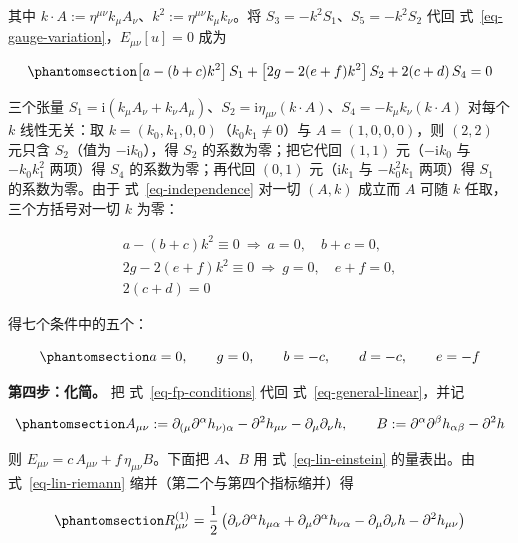 \documentclass[
  chinese,
  a4paper,
  UTF8,
  12pt,
  oneside,
  openany]{ctexbook}
\theoremstyle{plain}
\theoremstyle{plain}
\theoremstyle{plain}
\theoremstyle{definition}
\theoremstyle{plain}
\theoremstyle{plain}
\theoremstyle{remark}
\begin{document}
其中
\(k\cdot A:=\eta^{\mu\nu}k_{\mu}A_{\nu}\)、\(k^{2}:=\eta^{\mu\nu}k_{\mu}k_{\nu}\)。将
\(S_{3}=-k^{2}S_{1}\)、\(S_{5}=-k^{2}S_{2}\) 代回
式~\ref{eq-gauge-variation}，\(E_{\mu\nu}[u]=0\) 成为

\begin{equation}\protect\phantomsection\label{eq-independence}{
\left[a-(b+c)k^{2}\right]S_{1}
+\left[2g-2(e+f)k^{2}\right]S_{2}
+2(c+d)\,S_{4}=0
}\end{equation}

三个张量
\(S_{1}=\mathrm{i}(k_{\mu}A_{\nu}+k_{\nu}A_{\mu})\)、\(S_{2}=\mathrm{i}\eta_{\mu\nu}(k\cdot A)\)、\(S_{4}=-k_{\mu}k_{\nu}(k\cdot A)\)
对每个 \(k\) 线性无关：取
\(k=(k_{0},k_{1},0,0)\)（\(k_{0}k_{1}\neq0\)）与 \(A=(1,0,0,0)\)，则
\((2,2)\) 元只含 \(S_{2}\)（值为 \(-\mathrm{i}k_{0}\)），得 \(S_{2}\)
的系数为零；把它代回 \((1,1)\) 元（\(-\mathrm{i}k_{0}\) 与
\(-k_{0}k_{1}^{2}\) 两项）得 \(S_{4}\) 的系数为零；再代回 \((0,1)\)
元（\(\mathrm{i}k_{1}\) 与 \(-k_{0}^{2}k_{1}\) 两项）得 \(S_{1}\)
的系数为零。由于 式~\ref{eq-independence} 对一切 \((A,k)\) 成立而 \(A\)
可随 \(k\) 任取，三个方括号对一切 \(k\) 为零：

\[
\begin{gathered}
a-(b+c)k^{2}\equiv0\ \Longrightarrow\ a=0,\quad b+c=0,\\
2g-2(e+f)k^{2}\equiv0\ \Longrightarrow\ g=0,\quad e+f=0,\\
2(c+d)=0
\end{gathered}
\]

得七个条件中的五个：

\begin{equation}\protect\phantomsection\label{eq-fp-conditions}{
a = 0,
\qquad
g = 0,
\qquad
b = -c,
\qquad
d = -c,
\qquad
e = -f
}\end{equation}

\textbf{第四步：化简。} 把 式~\ref{eq-fp-conditions} 代回
式~\ref{eq-general-linear}，并记

\begin{equation}\protect\phantomsection\label{eq-AB-def}{
A_{\mu\nu}:=\partial_{(\mu}\partial^{\alpha}h_{\nu)\alpha}-\partial^{2} h_{\mu\nu}-\partial_{\mu}\partial_{\nu}h,
\qquad
B:=\partial^{\alpha}\partial^{\beta}h_{\alpha\beta}-\partial^{2} h
}\end{equation}

则 \(E_{\mu\nu}=c\,A_{\mu\nu}+f\,\eta_{\mu\nu}B\)。下面把 \(A\)、\(B\)
用 式~\ref{eq-lin-einstein} 的量表出。由 式~\ref{eq-lin-riemann}
缩并（第二个与第四个指标缩并）得

\begin{equation}\protect\phantomsection\label{eq-lin-ricci}{
R^{(1)}_{\mu\nu}
= \frac{1}{2}\left(
\partial_{\nu}\partial^{\alpha}h_{\mu\alpha}
+\partial_{\mu}\partial^{\alpha}h_{\nu\alpha}
-\partial_{\mu}\partial_{\nu}h
-\partial^{2}h_{\mu\nu}
\right)
}\end{equation}
\end{document}
